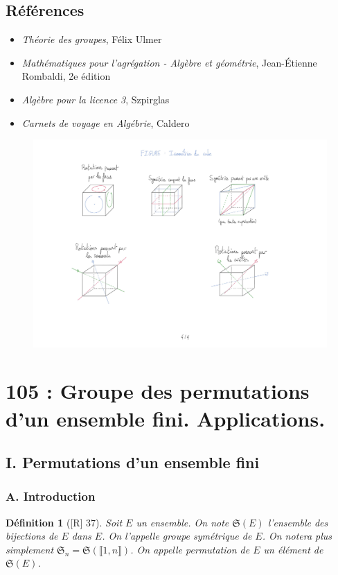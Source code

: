 \documentclass[10pt, a4paper, parskip=full, twoside, twocolumn]{report}
\newtheorem{definition}{Définition}
\begin{document}
\section*{Références}
\begin{itemize}
	\item[U] \emph{Théorie des groupes}, Félix Ulmer
	\item[R] \emph{Mathématiques pour l'agrégation - Algèbre et géométrie}, Jean-Étienne Rombaldi, 2e édition
	\item[S] \emph{Algèbre pour la licence 3}, Szpirglas
	\item[C] \emph{Carnets de voyage en Algébrie}, Caldero
\end{itemize}

\begin{figure}[!htb]
	\centering
	\includegraphics[trim={0 0 0 0},clip,width=1\linewidth]{img/101.pdf}
\end{figure}


\chapter*{105 : Groupe des permutations d'un ensemble fini. Applications.}
\setcounter{definition}{0}
\section*{I. Permutations d'un ensemble fini}
\subsection*{A. Introduction}
\begin{definition}[\textnormal{[R] 37}]
	Soit $E$ un ensemble. On note $\mathfrak{S}(E)$
	l'ensemble des bijections de $E$ dans $E$. On l'appelle \emph{groupe symétrique} de $E$.
	On notera plus simplement $\mathfrak{S}_n = \mathfrak{S}(\llbracket 1, n\rrbracket)$.
	On appelle \emph{permutation} de $E$ un élément de $\mathfrak{S}(E)$.
\end{definition}
\end{document}

